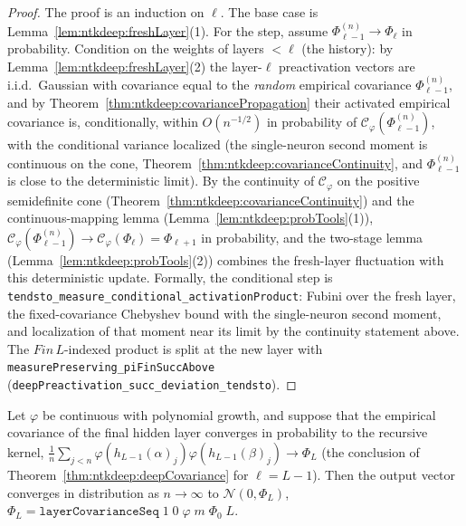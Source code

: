 \begin{proof}
  \leanok
The proof is an induction on $\ell$. The base case is Lemma~\ref{lem:ntkdeep:freshLayer}(1). For the step, assume $\Phi^{(n)}_{\ell-1}\to\Phi_\ell$ in probability. Condition on the weights of layers $<\ell$ (the history): by Lemma~\ref{lem:ntkdeep:freshLayer}(2) the layer-$\ell$ preactivation vectors are i.i.d.\ Gaussian with covariance equal to the \emph{random}
empirical covariance $\Phi^{(n)}_{\ell-1}$, and by Theorem~\ref{thm:ntkdeep:covariancePropagation} their activated empirical covariance is, conditionally, within $O(n^{-1/2})$ in probability of $\mathcal C_\varphi(\Phi^{(n)}_{\ell-1})$, with the conditional variance localized (the single-neuron second moment is continuous on the cone, Theorem~\ref{thm:ntkdeep:covarianceContinuity}, and $\Phi^{(n)}_{\ell-1}$ is close to the deterministic limit).
By the continuity of $\mathcal C_\varphi$ on the positive semidefinite cone (Theorem~\ref{thm:ntkdeep:covarianceContinuity}) and the continuous-mapping lemma (Lemma~\ref{lem:ntkdeep:probTools}(1)), $\mathcal C_\varphi(\Phi^{(n)}_{\ell-1})\to\mathcal C_\varphi(\Phi_\ell)=\Phi_{\ell+1}$ in probability, and the two-stage lemma (Lemma~\ref{lem:ntkdeep:probTools}(2)) combines the fresh-layer fluctuation with this deterministic update.
Formally, the conditional step is \texttt{tendsto\_measure\_conditional\_activationProduct}: Fubini over the fresh layer, the fixed-covariance Chebyshev bound with the single-neuron second moment, and localization of that moment near its limit by the continuity statement above. The $Fin\,L$-indexed product is split at the new layer with \texttt{measurePreserving\_piFinSuccAbove} (\texttt{deepPreactivation\_succ\_deviation\_tendsto}).
\end{proof}

\begin{theorem}\label{thm:ntkdeep:deepOutputStandalone}
  \leanok
Let $\varphi$ be continuous with polynomial growth, and suppose that the empirical covariance of the final hidden layer converges in probability to the recursive kernel,
$\frac1n\sum_{j<n}\varphi(h_{L-1}(\alpha)_j)\varphi(h_{L-1}(\beta)_j)\to\Phi_L$ (the conclusion of Theorem~\ref{thm:ntkdeep:deepCovariance} for $\ell=L-1$). Then the output vector converges in distribution as $n\to\infty$ to $\mathcal N(0,\Phi_L)$, $\Phi_L=\texttt{layerCovarianceSeq}\;1\;0\;\varphi\;m\;\Phi_0\;L$.
\end{theorem}

